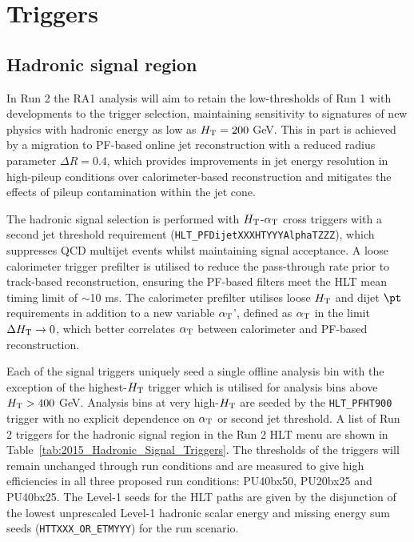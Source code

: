 \section{Triggers}
\label{sec:triggers}


\subsection{Hadronic signal region}

In Run 2 the RA1 analysis will aim to retain the low-thresholds of Run 1 with developments to the trigger selection, maintaining sensitivity to signatures of new physics with hadronic energy as low as $\mbox{$H_\text{T}$} = 200$ GeV. This in part is achieved by a migration to PF-based online jet reconstruction with a reduced radius parameter $\Delta R = 0.4$, which provides improvements in jet energy resolution in high-pileup conditions over calorimeter-based reconstruction and mitigates the effects of pileup contamination within the jet cone.

The hadronic signal selection is performed with $\mbox{$H_\text{T}$}$-$\alpha_{\text{T}}$ cross triggers with a second jet threshold requirement (\verb!HLT_PFDijetXXXHTYYYAlphaTZZZ!), which suppresses QCD multijet events whilst maintaining signal acceptance.  A loose calorimeter trigger prefilter is utilised to reduce the pass-through rate prior to track-based reconstruction, ensuring the PF-based filters meet the HLT mean timing limit of $\sim$10 ms. The calorimeter prefilter utilises loose $\mbox{$H_\text{T}$}$ and dijet $\pt$ requirements in addition to a new variable $\alpha_{\text{T}}$', defined as $\alpha_{\text{T}}$ in the limit $\Delta\mbox{$H_\text{T}$} \rightarrow 0$, which better correlates $\alpha_{\text{T}}$ between calorimeter and PF-based reconstruction.

Each of the signal triggers uniquely seed a single offline analysis bin with the exception of the highest-$\mbox{$H_\text{T}$}$ trigger which is utilised for analysis bins above $\mbox{$H_\text{T}$} > 400$ GeV. Analysis bins at very high-$\mbox{$H_\text{T}$}$ are seeded by the \verb!HLT_PFHT900! trigger with no explicit dependence on $\alpha_{\text{T}}$ or second jet threshold. A list of Run 2 triggers for the hadronic signal region in the Run 2 HLT menu are shown in Table~\ref{tab:2015_Hadronic_Signal_Triggers}. The thresholds of the triggers will remain unchanged through run conditions and are measured to give high efficiencies in all three proposed run conditions: PU40bx50, PU20bx25 and PU40bx25. The Level-1 seeds for the HLT paths are given by the disjunction of the lowest unprescaled Level-1 hadronic scalar energy and missing energy sum seeds (\verb!HTTXXX_OR_ETMYYY!) for the run scenario.

